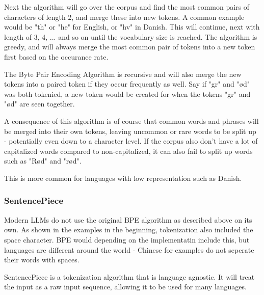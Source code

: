 Next the algorithm will go over the corpus and find the most common pairs of characters of length 2, and merge these into new tokens. A common example would be "th" or "he" for English, or "hv" in Danish. This will continue, next with length of 3, 4, ... and so on until the vocabulary size is reached. The algorithm is greedy, and will always merge the most common pair of tokens into a new token first based on the occurance rate.

The Byte Pair Encoding Algorithm is recursive and will also merge the new tokens into a paired token if they occur frequently as well. Say if "gr" and "ød" was both tokenied, a new token would be created for when the tokens "gr" and "ød" are seen together.

A consequence of this algorithm is of course that common words and phrases will be merged into their own tokens, leaving uncommon or rare words to be split up - potentially even down to a character level. If the corpus also don't have a lot of capitalized words compared to non-capitalized, it can also fail to split up words such as "Rød" and "rød".

This is more common for languages with low representation such as Danish.

\subsubsection{SentencePiece}

Modern LLMs do not use the original BPE algorithm as described above on its own. As shown in the examples in the beginning, tokenization also included the space character. BPE would depending on the implementatin include this, but languages are different around the world - Chinese for examples do not seperate their words with spaces.

SentencePiece is a tokenization algorithm that is language agnostic.\cite{kudo_sentencepiece_2018} It will treat the input as a raw input sequence, allowing it to be used for many languages.
